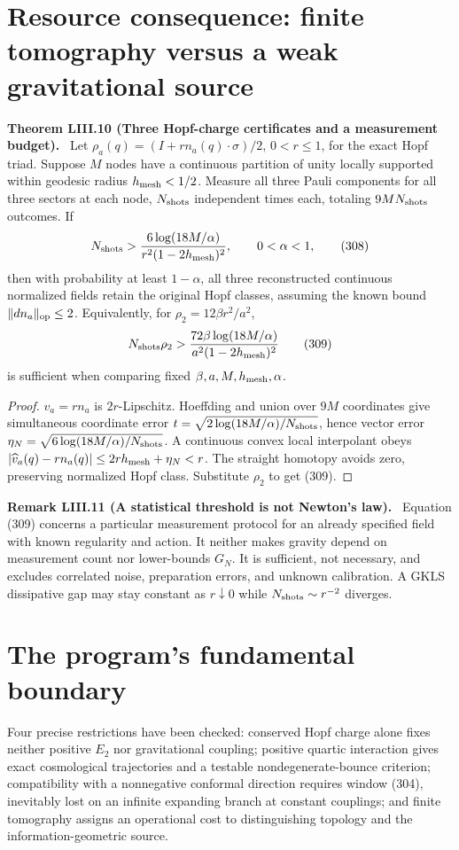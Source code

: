 \documentclass[11pt,a4paper,oneside]{book}
\newcommand{\statement}[3]{\par\medskip\noindent\textbf{#1 #2 (#3).}\ }
\begin{document}
\section{Resource consequence: finite tomography versus a weak gravitational source}
\statement{Theorem}{LIII.10}{Three Hopf-charge certificates and a measurement budget}
Let $\rho_a(q)=(I+rn_a(q)\cdot\sigma)/2$, $0<r\le1$, for the exact Hopf triad. Suppose $M$ nodes have a continuous partition of unity locally supported within geodesic radius $h_{\rm mesh}<1/2$. Measure all three Pauli components for all three sectors at each node, $N_{\rm shots}$ independent times each, totaling $9MN_{\rm shots}$ outcomes. If
\begin{equation}N_{\rm shots}>\frac{6\log(18M/\alpha)}{r^2(1-2h_{\rm mesh})^2},\qquad0<\alpha<1,\tag{308}\end{equation}
then with probability at least $1-\alpha$, all three reconstructed continuous normalized fields retain the original Hopf classes, assuming the known bound $\|dn_a\|_{\rm op}\le2$. Equivalently, for $\rho_2=12\beta r^2/a^2$,
\begin{equation}N_{\rm shots}\rho_2>\frac{72\beta\log(18M/\alpha)}{a^2(1-2h_{\rm mesh})^2}\tag{309}\end{equation}
is sufficient when comparing fixed $\beta,a,M,h_{\rm mesh},\alpha$.
\begin{proof}
$v_a=rn_a$ is $2r$-Lipschitz. Hoeffding and union over $9M$ coordinates give simultaneous coordinate error $t=\sqrt{2\log(18M/\alpha)/N_{\rm shots}}$, hence vector error $\eta_N=\sqrt{6\log(18M/\alpha)/N_{\rm shots}}$. A continuous convex local interpolant obeys $|\widehat v_a(q)-rn_a(q)|\le2rh_{\rm mesh}+\eta_N<r$. The straight homotopy avoids zero, preserving normalized Hopf class. Substitute $\rho_2$ to get (309).
\end{proof}
\statement{Remark}{LIII.11}{A statistical threshold is not Newton's law}
Equation (309) concerns a particular measurement protocol for an already specified field with known regularity and action. It neither makes gravity depend on measurement count nor lower-bounds $G_N$. It is sufficient, not necessary, and excludes correlated noise, preparation errors, and unknown calibration. A GKLS dissipative gap may stay constant as $r\downarrow0$ while $N_{\rm shots}\sim r^{-2}$ diverges.
\section{The program's fundamental boundary}
Four precise restrictions have been checked: conserved Hopf charge alone fixes neither positive $E_2$ nor gravitational coupling; positive quartic interaction gives exact cosmological trajectories and a testable nondegenerate-bounce criterion; compatibility with a nonnegative conformal direction requires window (304), inevitably lost on an infinite expanding branch at constant couplings; and finite tomography assigns an operational cost to distinguishing topology and the information-geometric source.
\end{document}
